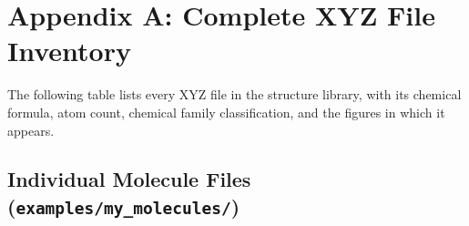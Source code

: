 \documentclass[11pt,a4paper]{article}
\begin{document}
\appendix

\section{Appendix A: Complete XYZ File Inventory}
\label{sec:appendix_xyz}

The following table lists every XYZ file in the structure library, with
its chemical formula, atom count, chemical family classification, and
the figures in which it appears.

\subsection{Individual Molecule Files (\texttt{examples/my\_molecules/})}
\end{document}
